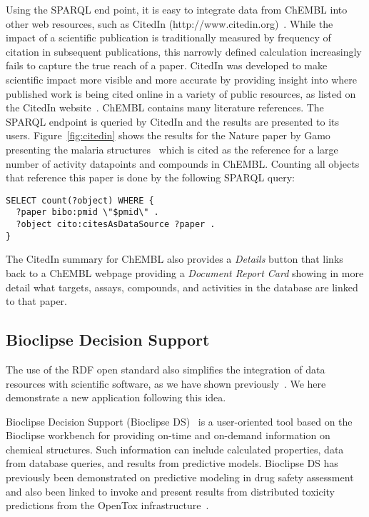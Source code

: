 \documentclass[10pt]{bmc_article}
\newenvironment{bmcformat}{\begin{raggedright}\baselineskip20pt\sloppy\setboolean{publ}{false}}{\end{raggedright}\baselineskip20pt\sloppy}
\begin{document}
\begin{bmcformat}
Using the SPARQL end point, it is easy to integrate data from ChEMBL into other web resources, such as CitedIn (http://www.citedin.org)~\cite{CitedIn2011}.
While the impact of a scientific publication is traditionally measured by frequency of citation in subsequent publications, this
narrowly defined calculation increasingly fails to capture the true reach of a paper. CitedIn was developed to make scientific
impact more visible and more accurate by providing insight into where published work is being cited online in a variety of public
resources, as listed on the CitedIn website~\cite{CitedResources}.
ChEMBL contains many literature references. The SPARQL endpoint is queried by CitedIn and the results are presented to its users.
Figure~\ref{fig:citedin} shows the results for the Nature paper by Gamo presenting the malaria structures~\cite{Gamo2010}
which is cited as the reference for a large number of activity datapoints and compounds in ChEMBL.
Counting all objects that reference this paper is done by the following SPARQL query:

\begin{small}
\begin{verbatim}
SELECT count(?object) WHERE {
  ?paper bibo:pmid \"$pmid\" .
  ?object cito:citesAsDataSource ?paper .
}
\end{verbatim}
\end{small}

The CitedIn summary for ChEMBL also provides a \textit{Details} button that links back to a ChEMBL webpage providing
a \textit{Document Report Card} showing in more detail what targets, assays, compounds, and activities in the database
are linked to that paper.

\subsection*{Bioclipse Decision Support}

The use of the RDF open standard also simplifies the integration of data resources with 
scientific software, as we have shown previously~\cite{Willighagen2011,Willighagen:2011kx}.
We here demonstrate a new application following this idea.

Bioclipse Decision Support (Bioclipse DS)~\cite{Spjuth:2011uq} is a user-oriented tool based on the Bioclipse 
workbench for providing on-time and on-demand information on chemical structures. 
Such information can include calculated properties, data from database queries, 
and results from predictive models. Bioclipse DS has previously been demonstrated on predictive 
modeling in drug safety assessment~\cite{Spjuth:2011uq} and also been linked to invoke and 
present results from distributed toxicity predictions from the OpenTox infrastructure~\cite{Willighagen:2011kx}.


\end{bmcformat}
\end{document}
